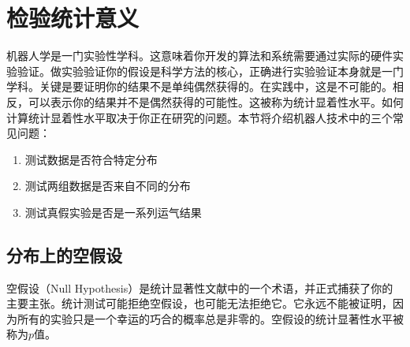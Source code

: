\section{检验统计意义}
\label{sec:stattest}
机器人学是一门实验性学科。这意味着你开发的算法和系统需要通过实际的硬件实验验证。做实验验证你的假设是科学方法的核心，正确进行实验验证本身就是一门学科。关键是要证明你的结果不是单纯偶然获得的。在实践中，这是不可能的。相反，可以表示你的结果并不是偶然获得的可能性。这被称为统计显着性水平。如何计算统计显着性水平取决于你正在研究的问题。本节将介绍机器人技术中的三个常见问题：

\begin{enumerate}

\item 测试数据是否符合特定分布
\item 测试两组数据是否来自不同的分布
\item 测试真假实验是否是一系列运气结果
\end{enumerate}


\subsection{分布上的空假设}
空假设（Null Hypothesis）是统计显著性文献中的一个术语，并正式捕获了你的主要主张。统计测试可能拒绝空假设，也可能无法拒绝它。它永远不能被证明，因为所有的实验只是一个幸运的巧合的概率总是非零的。空假设的统计显著性水平被称为$p$值。


